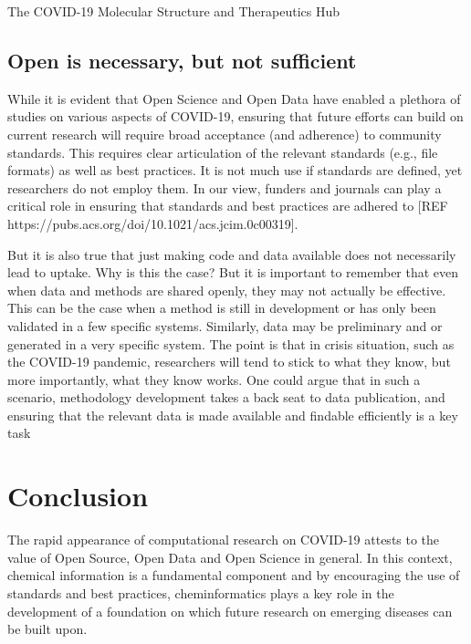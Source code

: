 \documentclass{bmcart}
\begin{document}
The COVID-19
Molecular Structure and Therapeutics Hub


\subsection*{Open is necessary, but not sufficient}

While it is evident that Open Science and Open Data have enabled a
plethora of studies on various aspects of COVID-19, ensuring that
future efforts can build on current research will require broad
acceptance (and adherence) to community standards. This requires clear
articulation of the relevant standards (e.g., file formats) as well as
best practices. It is not much use if standards are defined, yet
researchers do not employ them. In our view, funders and journals can
play a critical role in ensuring that standards and best practices are
adhered to [REF https://pubs.acs.org/doi/10.1021/acs.jcim.0c00319].

But it is also true that just making code and data available does not
necessarily lead to uptake. Why is this the case? 
But it is important to remember that even when data and methods are
shared openly, they may not actually be effective. This can be the
case when a method is still in development or has only been validated
in a few specific systems. Similarly, data may be preliminary and or
generated in a very specific system. The point is that in crisis
situation, such as the COVID-19 pandemic, researchers will tend to
stick to what they know, but more importantly, what they know
works. One could argue that in such a scenario, methodology
development takes a back seat to data publication, and ensuring that
the relevant data is made available and findable efficiently is a key task




\section*{Conclusion}

The rapid appearance of computational research on COVID-19 attests
to the value of Open Source, Open Data and Open Science in
general. In this context, chemical information is a fundamental
component and by encouraging the use of standards and best practices,
cheminformatics plays a key role in the development of a foundation on
which future research on emerging diseases can be built upon.
\end{document}
